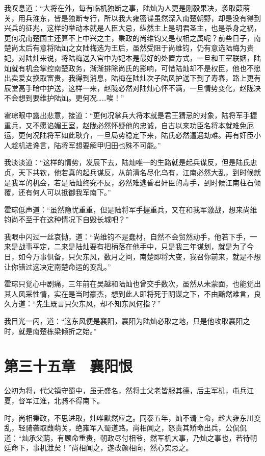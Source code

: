 我叹息道：“大将在外，每有临机独断之事，陆灿为人更是刚毅果决，袭取葭萌关，用兵淮东，皆是独断专行，所以我大雍密谍虽然深入南楚朝野，却是没有得到兴兵的征兆，这样的举动本就是人臣大忌，纵然主上是明君圣主，也是杀身之祸，更何况南楚国主还算不上中兴之主，秉政的尚维钧又是权相之属呢？前些日子，南楚尚太后有意将陆灿之女陆梅选为王后，虽然受阻于尚维钧，仍有意选陆梅为贵妃，对陆灿来说，将陆梅送入宫中为妃本是最好的处置方式，一旦和王室联姻，陆灿就有机会掌控南楚政务，渐渐排除尚氏的影响，可惜陆灿却不是权臣，他也不愿出卖爱女换取富贵，我得到消息，陆梅在陆灿次子陆风护送下到了寿春，路上更有辰堂高手暗中护送，这样一来，赵陇必然对陆灿心怀不满，一旦情势变化，赵陇决不会想到要维护陆灿。更何况……唉！”

霍琮眼中露出悲意，接道：“更何况掌兵大将本就是君王猜忌的对象，陆将军手握重兵，又不愿谄媚王室，赵陇必然怀疑他的忠诚，自古以来功臣名将本就难免厄运，更何况陆将军如此耿介，一旦局势稳定下来，陆氏必然遭遇劫难。再有奸臣小人趁机进谗言，陆将军想要解甲归田也殊不可能。”

我淡淡道：“这样的情势，发展下去，陆灿唯一的生路就是起兵谋反，但是陆氏忠贞，天下共钦，他若真的起兵谋反，从前清名尽化乌有，江南必然大乱，到时候就是我军的机会，若是陆灿终究不反，必然难逃昏君奸臣的毒手，到时候江南柱石倾覆，还有何人可以抵御我军南下。”

霍琮低声道：“虽然隐忧重重，但是陆将军手握重兵，又在和我军激战，想来尚维钧尚不至于在这种情况下自毁长城吧？”

我眼中闪过一丝哀恸，道：“尚维钧不是蠢材，自然不会贸然动手，他若下手，一来是战事平定，二来是陆灿要有把柄落在他手中，只是我三年谋划，就是为了今日，如今万事俱备，只欠东风，数月之间，南楚即将大变，我召你前来，就是不想让你错过这决定南楚命运的变乱。”

霍琮只觉心中剧痛，三年前在吴越和陆灿也曾交手数次，虽然从未蒙面，也能觉出其人风采性情，实在是当时豪杰，想到此人即将死于阴谋之下，不由黯然难言，良久方道：“先生既言只欠东风，却不知东风何指？”

我目光一闪，道：“这东风便是襄阳，襄阳为陆灿必取之地，只是他攻取襄阳之时，就是南楚栋梁倾折之始。”

\chapter{第三十五章　襄阳恨}

公初为将，代父镇守蜀中，虽无盛名，然将士父老皆服其德，后主军机，屯兵江夏，督军江淮，北骑不得南下。

时，尚相秉政，不思进取，灿唯默然应之。同泰五年，灿不请上命，趁大雍东川变乱，轻骑袭取葭萌关，绝雍军入蜀道路。尚相闻之，怒责其矫命出兵，公侃侃道：“灿承父荫，有顾命重责，朝政尽付相爷，然军机大事，乃灿之事也，若待朝廷命下，事机泄矣！”尚相闻之，遂改颜相向，然心实忌之。

